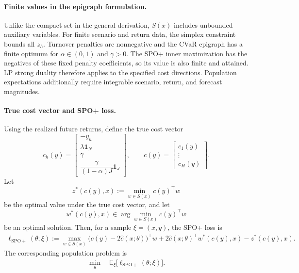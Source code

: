 \documentclass[11pt]{article}
\theoremstyle{definition}
\begin{document}
\paragraph{Finite values in the epigraph formulation.}
Unlike the compact set in the general derivation, $S(x)$ includes unbounded auxiliary variables. For finite scenario and return data, the simplex constraint bounds all $z_h$. Turnover penalties are nonnegative and the CVaR epigraph has a finite optimum for $\alpha\in(0,1)$ and $\gamma>0$. The SPO+ inner maximization has the negatives of these fixed penalty coefficients, so its value is also finite and attained. LP strong duality therefore applies to the specified cost directions. Population expectations additionally require integrable scenario, return, and forecast magnitudes.

\paragraph{True cost vector and SPO+ loss.}
Using the realized future returns, define the true cost vector
\[
c_h(y)=
\begin{bmatrix}
-y_h\\
\lambda \mathbf 1_N\\
\gamma\\
\dfrac{\gamma}{(1-\alpha)J}\mathbf 1_J
\end{bmatrix},
\qquad
c(y)=\begin{bmatrix}c_1(y)\\ \vdots\\ c_H(y)\end{bmatrix}.
\]
Let
\[
z^*(c(y),x):=\min_{w\in S(x)} c(y)^\top w
\]
be the optimal value under the true cost vector, and let
\[
w^*(c(y),x)\in \arg\min_{w\in S(x)} c(y)^\top w
\]
be an optimal solution. Then, for a sample $\xi=(x,y)$, the SPO+ loss is
\begin{align}
\ell_{\mathrm{SPO+}}(\theta;\xi)
:=
\max_{w\in S(x)}
\big(c(y)-2\hat c(x;\theta)\big)^\top w
+2\hat c(x;\theta)^\top w^*(c(y),x)
-z^*(c(y),x).
\label{eq:spo-cvar-short}
\end{align}
The corresponding population problem is
\begin{align}
\min_{\theta}\quad
\mathbb E_{\xi}\big[\ell_{\mathrm{SPO+}}(\theta;\xi)\big].
\label{eq:spo-cvar-pop-short}
\end{align}
\end{document}
